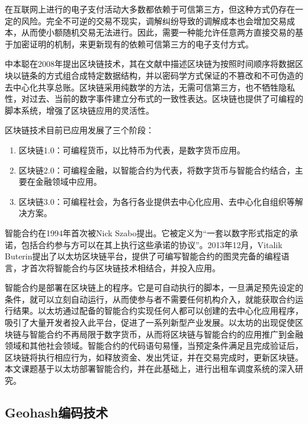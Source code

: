 \space 在互联网上进行的电子支付活动大多数都依赖于可信第三方，但这种方式仍存在一定的风险。完全不可逆的交易不现实，调解纠纷导致的调解成本也会增加交易成本，从而使小额随机交易无法进行。因此，需要一种能允许任意两方直接交易的基于加密证明的机制，来更新现有的依赖可信第三方的电子支付方式。

\space 中本聪在2008年提出区块链技术，其在文献中描述区块链为按照时间顺序将数据区块以链条的方式组合成特定数据结构，并以密码学方式保证的不篡改和不可伪造的去中心化共享总账\cite{2008Bitcoin}。区块链采用纯数学的方法，无需可信第三方，也不牺牲隐私性，对过去、当前的数字事件建立分布式的一致性表达\cite{袁勇2016区块链技术发展现状与展望}。区块链也提供了可编程的脚本系统，增强了区块链应用的灵活性\cite{贺海武2018基于区块链的智能合约技术与应用综述}。

区块链技术目前已应用发展了三个阶段\cite{swan2015blockchain}：

\begin{enumerate}
    \item 区块链1.0：可编程货币，以比特币为代表，是数字货币应用。
    \item 区块链2.0：可编程金融，以智能合约为代表，将数字货币与智能合约结合，主要在金融领域中应用。
    \item 区块链3.0：可编程社会，为各行各业提供去中心化应用、去中心化自组织等解决方案。
\end{enumerate}

智能合约在1994年首次被Nick Szabo提出\cite{1997Formalizing}。它被定义为``一套以数字形式指定的承诺，包括合约参与方可以在其上执行这些承诺的协议”。2013年12月，Vitalik Buterin提出了以太坊区块链平台，提供了可编写智能合约的图灵完备的编程语言，才首次将智能合约与区块链技术相结合，并投入应用\cite{2014ASmartContract}。

智能合约是部署在区块链上的程序。它是可自动执行的脚本，一旦满足预先设定的条件，就可以立刻自动运行，从而使参与者不需要任何机构介入，就能获取合约运行结果。以太坊通过配备的智能合约实现任何人都可以创建的去中心化应用程序，吸引了大量开发者投入此平台，促进了一系列新型产业发展。以太坊的出现促使区块链与智能合约不再局限于数字货币，从而将区块链与智能合约的应用推广到金融领域和其他社会领域\cite{欧阳丽炜2019智能合约}。智能合约的代码语句易懂，当预定条件满足且完成验证后，区块链将执行相应行为，如释放资金、发出凭证，并在交易完成时，更新区块链。本文课题基于以太坊部署智能合约，并在此基础上，进行出租车调度系统的深入研究。

\subsection{Geohash编码技术}

